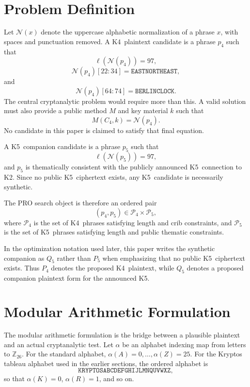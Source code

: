 \documentclass[12pt]{paperFormatting}
\newcommand{\Kfour}{K4}
\newcommand{\Kfive}{K5}
\newcommand{\Ktwo}{K2}
\newcommand{\Cipher}{C}
\newcommand{\Norm}{\mathcal{N}}
\newcommand{\Len}{\ell}
\begin{document}
\begin{thesisbody}
\section{Problem Definition}
Let $\Norm(x)$ denote the uppercase alphabetic normalization of a phrase $x$, with spaces and punctuation removed. A \Kfour\ plaintext candidate is a phrase $p_4$ such that
\begin{equation}
    \Len(\Norm(p_4)) = 97,
\end{equation}
\begin{equation}
    \Norm(p_4)[22:34] = \texttt{EASTNORTHEAST},
\end{equation}
and
\begin{equation}
    \Norm(p_4)[64:74] = \texttt{BERLINCLOCK}.
\end{equation}
The central cryptanalytic problem would require more than this. A valid solution must also provide a public method $M$ and key material $k$ such that
\begin{equation}
    M(\Cipher_4,k) = \Norm(p_4).
\end{equation}
No candidate in this paper is claimed to satisfy that final equation.

A \Kfive\ companion candidate is a phrase $p_5$ such that
\begin{equation}
    \Len(\Norm(p_5)) = 97,
\end{equation}
and $p_5$ is thematically consistent with the publicly announced \Kfive\ connection to \Ktwo. Since no public \Kfive\ ciphertext exists, any \Kfive\ candidate is necessarily synthetic.

The PRO search object is therefore an ordered pair
\begin{equation}
    (p_4,p_5) \in \mathcal{P}_4 \times \mathcal{P}_5,
\end{equation}
where $\mathcal{P}_4$ is the set of \Kfour\ phrases satisfying length and crib constraints, and $\mathcal{P}_5$ is the set of \Kfive\ phrases satisfying length and public thematic constraints.

In the optimization notation used later, this paper writes the synthetic companion as $Q_5$ rather than $P_5$ when emphasizing that no public \Kfive\ ciphertext exists. Thus $P_4$ denotes the proposed \Kfour\ plaintext, while $Q_5$ denotes a proposed companion plaintext form for the announced \Kfive.

\section{Modular Arithmetic Formulation}
The modular arithmetic formulation is the bridge between a plausible plaintext and an actual cryptanalytic test. Let $\alpha$ be an alphabet indexing map from letters to $\mathbb{Z}_{26}$. For the standard alphabet, $\alpha(A)=0,\ldots,\alpha(Z)=25$. For the Kryptos tableau alphabet used in the earlier sections, the ordered alphabet is
\begin{equation}
    \texttt{KRYPTOSABCDEFGHIJLMNQUVWXZ},
\end{equation}
so that $\alpha(K)=0$, $\alpha(R)=1$, and so on.


\end{thesisbody}
\end{document}
